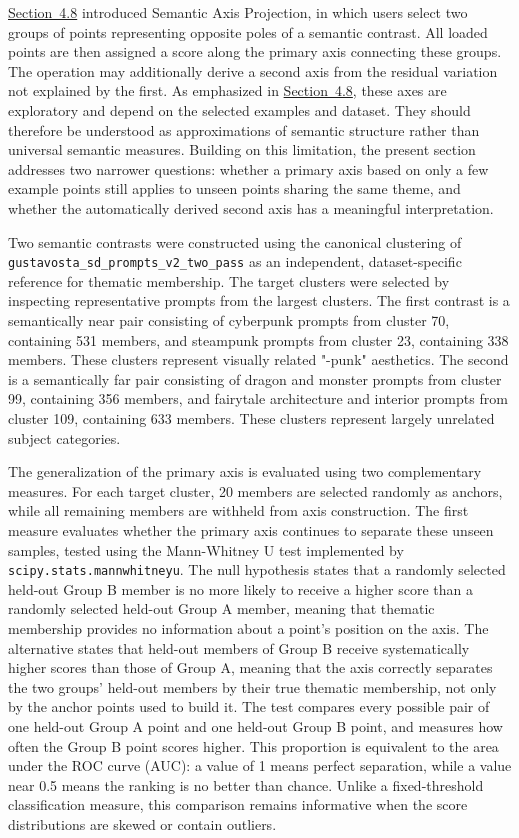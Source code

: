 \hyperref[sec:4.8]{Section~4.8} introduced Semantic Axis Projection, in which users select two groups of points representing opposite poles of a semantic contrast. All loaded points are then assigned a score along the primary axis connecting these groups. The operation may additionally derive a second axis from the residual variation not explained by the first. As emphasized in \hyperref[sec:4.8]{Section~4.8}, these axes are exploratory and depend on the selected examples and dataset. They should therefore be understood as approximations of semantic structure rather than universal semantic measures. Building on this limitation, the present section addresses two narrower questions: whether a primary axis based on only a few example points still applies to unseen points sharing the same theme, and whether the automatically derived second axis has a meaningful interpretation.

Two semantic contrasts were constructed using the canonical clustering of \texttt{gustavosta\_sd\_prompts\_v2\_two\_pass} as an independent, dataset-specific reference for thematic membership. The target clusters were selected by inspecting representative prompts from the largest clusters. The first contrast is a semantically near pair consisting of cyberpunk prompts from cluster 70, containing 531 members, and steampunk prompts from cluster 23, containing 338 members. These clusters represent visually related "-punk" aesthetics. The second is a semantically far pair consisting of dragon and monster prompts from cluster 99, containing 356 members, and fairytale architecture and interior prompts from cluster 109, containing 633 members. These clusters represent largely unrelated subject categories.

The generalization of the primary axis is evaluated using two complementary measures. For each target cluster, 20 members are selected randomly as anchors, while all remaining members are withheld from axis construction. The first measure evaluates whether the primary axis continues to separate these unseen samples, tested using the Mann-Whitney U test implemented by \texttt{scipy.stats.mannwhitneyu}. The null hypothesis states that a randomly selected held-out Group B member is no more likely to receive a higher score than a randomly selected held-out Group A member, meaning that thematic membership provides no information about a point's position on the axis. The alternative states that held-out members of Group B receive systematically higher scores than those of Group A, meaning that the axis correctly separates the two groups' held-out members by their true thematic membership, not only by the anchor points used to build it. The test compares every possible pair of one held-out Group A point and one held-out Group B point, and measures how often the Group B point scores higher. This proportion is equivalent to the area under the ROC curve (AUC): a value of 1 means perfect separation, while a value near 0.5 means the ranking is no better than chance. Unlike a fixed-threshold classification measure, this comparison remains informative when the score distributions are skewed or contain outliers. \cite{geeksforgeeks2024mannwhitney}

